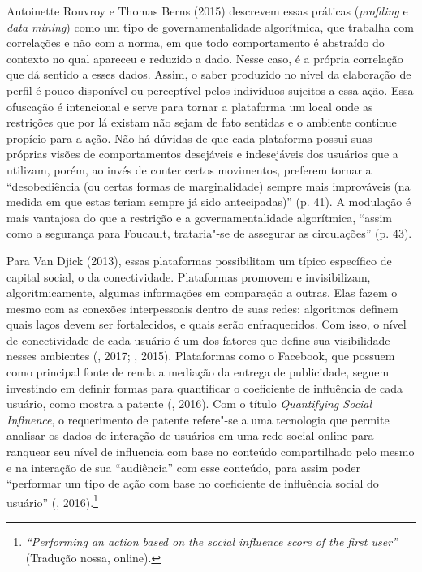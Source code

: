 Antoinette Rouvroy e Thomas Berns (2015) descrevem essas práticas
(\emph{profiling} e \emph{data mining}) como um tipo de
governamentalidade algorítmica, que trabalha com correlações e não com a
norma, em que todo comportamento é abstraído do contexto no qual
apareceu e reduzido a dado. Nesse caso, é a própria correlação que dá
sentido a esses dados. Assim, o saber produzido no nível da elaboração
de perfil é pouco disponível ou perceptível pelos indivíduos sujeitos a
essa ação. Essa ofuscação é intencional e serve para tornar a plataforma
um local onde as restrições que por lá existam não sejam de fato
sentidas e o ambiente continue propício para a ação. Não há dúvidas de
que cada plataforma possui suas próprias visões de comportamentos
desejáveis e indesejáveis dos usuários que a utilizam, porém, ao invés
de conter certos movimentos, preferem tornar a ``desobediência (ou
certas formas de marginalidade) sempre mais improváveis (na medida em
que estas teriam sempre já sido antecipadas)'' (p. 41). A modulação é mais
vantajosa do que a restrição e a governamentalidade algorítmica, ``assim
como a segurança para Foucault, trataria"-se de assegurar as
circulações'' (p. 43).

Para Van Djick (2013), essas plataformas possibilitam um típico
específico de capital social, o da conectividade. Plataformas promovem e
invisibilizam, algoritmicamente, algumas informações em comparação a
outras. Elas fazem o mesmo com as conexões interpessoais dentro de suas
redes: algoritmos definem quais laços devem ser fortalecidos, e quais
serão enfraquecidos. Com isso, o nível de conectividade de cada usuário
é um dos fatores que define sua visibilidade nesses ambientes (,
2017; , 2015). Plataformas como o Facebook, que possuem como
principal fonte de renda a mediação da entrega de publicidade, seguem
investindo em definir formas para quantificar o coeficiente de
influência de cada usuário, como mostra a patente 
(, 2016). Com o título \emph{Quantifying Social Influence}, o
requerimento de patente refere"-se a uma tecnologia que permite analisar
os dados de interação de usuários em uma rede social online para
ranquear seu nível de influencia com base no conteúdo compartilhado pelo
mesmo e na interação de sua ``audiência'' com esse conteúdo, para assim
poder ``performar um tipo de ação com base no coeficiente de influência
social do usuário'' (, 2016).\footnote{\emph{``Performing an action based on the social influence score of the first user''} (Tradução nossa, online).}

